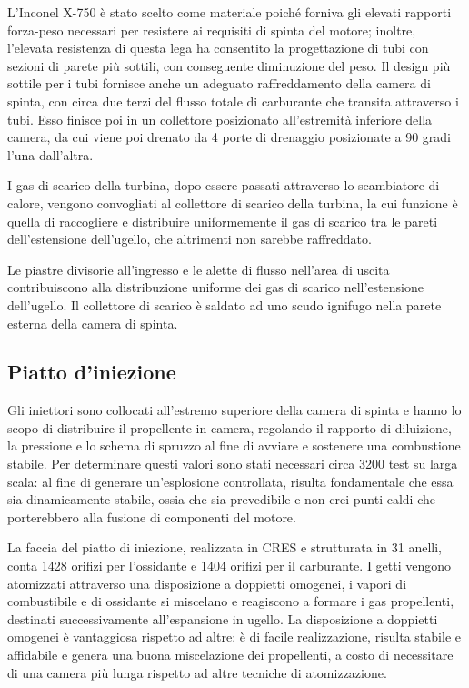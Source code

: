 L’Inconel X-750 è stato scelto come materiale poiché forniva gli elevati rapporti forza-peso necessari per resistere ai requisiti di spinta del motore; inoltre, l'elevata resistenza di questa lega ha consentito la progettazione di tubi con sezioni di parete più sottili, con conseguente diminuzione del peso. Il design più sottile per i tubi fornisce anche un adeguato raffreddamento della camera di spinta, con circa due terzi del flusso totale di carburante che transita attraverso i tubi. Esso finisce poi in un collettore posizionato all'estremità inferiore della camera, da cui viene poi drenato da 4 porte di drenaggio posizionate a 90 gradi l'una dall'altra.

I gas di scarico della turbina, dopo essere passati attraverso lo scambiatore di calore, vengono convogliati al collettore di scarico della turbina, la cui funzione è quella di raccogliere e distribuire uniformemente il gas di scarico tra le pareti dell’estensione dell'ugello, che altrimenti non sarebbe raffreddato.

Le piastre divisorie all'ingresso e le alette di flusso nell'area di uscita contribuiscono alla distribuzione uniforme dei gas di scarico nell'estensione dell'ugello. Il collettore di scarico è saldato ad uno scudo ignifugo nella parete esterna della camera di spinta.

\subsection{Piatto d'iniezione}
\label{subsec:piatto iniezione}


Gli iniettori sono collocati all’estremo superiore della camera di spinta e hanno lo scopo di distribuire il propellente in camera, regolando il rapporto di diluizione, la pressione e lo schema di spruzzo al fine di avviare e sostenere una combustione stabile. Per determinare questi valori sono stati necessari circa 3200 test su larga scala: al fine di generare un’esplosione controllata, risulta fondamentale che essa sia dinamicamente stabile, ossia che sia prevedibile e non crei punti caldi che porterebbero alla fusione di componenti del motore.

La faccia del piatto di iniezione, realizzata in CRES e strutturata in 31 anelli, conta 1428 orifizi per l’ossidante e 1404 orifizi per il carburante. I getti vengono atomizzati attraverso una disposizione a doppietti omogenei, i vapori di combustibile e di ossidante si miscelano e reagiscono a formare i gas propellenti, destinati successivamente all’espansione in ugello. La disposizione a doppietti omogenei è vantaggiosa rispetto ad altre: è di facile realizzazione, risulta stabile e affidabile e genera una buona miscelazione dei propellenti, a costo di necessitare di una camera più lunga rispetto ad altre tecniche di atomizzazione.

